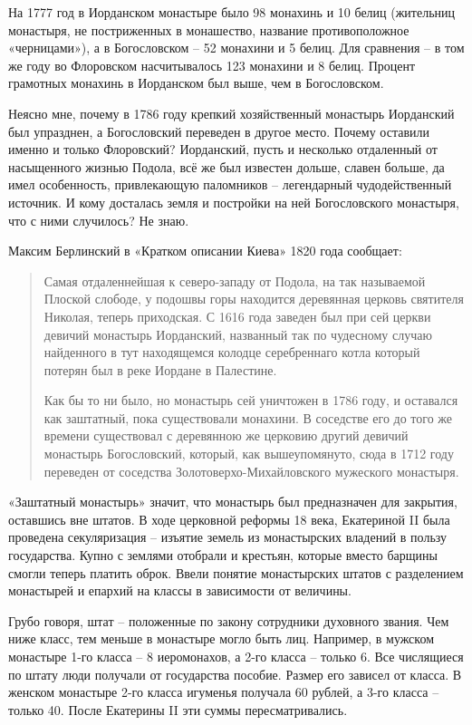 На 1777 год в Иорданском монастыре было 98 монахинь и 10 белиц (жительниц монастыря, не постриженных в монашество, название противоположное «черницами»), а в Богословском – 52 монахини и 5 белиц. Для сравнения – в том же году во Флоровском насчитывалось 123 монахини и 8 белиц. Процент грамотных монахинь в Иорданском был выше, чем в Богословском.

Неясно мне, почему в 1786 году крепкий хозяйственный монастырь Иорданский был упразднен, а Богословский переведен в другое место. Почему оставили именно и только Флоровский? Иорданский, пусть и несколько отдаленный от насыщенного жизнью Подола, всё же был известен дольше, славен больше, да имел особенность, привлекающую паломников – легендарный чудодейственный источник. И кому досталась земля и постройки на ней Богословского монастыря, что с ними случилось? Не знаю.

Максим Берлинский в «Кратком описании Киева» 1820 года сообщает:

\begin{quotation}
Самая отдаленнейшая к северо-западу от Подола, на так называемой Плоской слободе, у подошвы горы находится деревянная церковь святителя Николая, теперь приходская. С 1616 года заведен был при сей церкви девичий монастырь Иорданский, названный так по чудесному случаю найденного в тут находящемся колодце серебреннаго котла который потерян был в реке Иордане в Палестине. 

Как бы то ни было, но монастырь сей уничтожен в 1786  году, и оставался как заштатный, пока существовали монахини. В соседстве его до того же времени существовал с деревянною же церковию другий девичий монастырь Богословский, который, как вышеупомянуто, сюда в 1712 году переведен от соседства Золотоверхо-Михайловского мужеского монастыря.
\end{quotation}

«Заштатный монастырь» значит, что монастырь был предназначен для закрытия, оставшись вне штатов. В ходе церковной реформы 18 века, Екатериной II была проведена секуляризация – изъятие земель из монастырских владений в пользу государства. Купно с землями отобрали и крестьян, которые вместо барщины смогли теперь платить оброк. Ввели понятие монастырских штатов с разделением монастырей и епархий на классы в зависимости от величины. 

Грубо говоря, штат – положенные по закону сотрудники духовного звания. Чем ниже класс, тем меньше в монастыре могло быть лиц. Например, в мужском монастыре 1-го класса – 8 иеромонахов, а 2-го класса – только 6. Все числящиеся по штату люди получали от государства пособие. Размер его зависел от класса. В женском монастыре 2-го класса игуменья получала 60 рублей, а 3-го класса – только 40. После Екатерины II эти суммы пересматривались.

